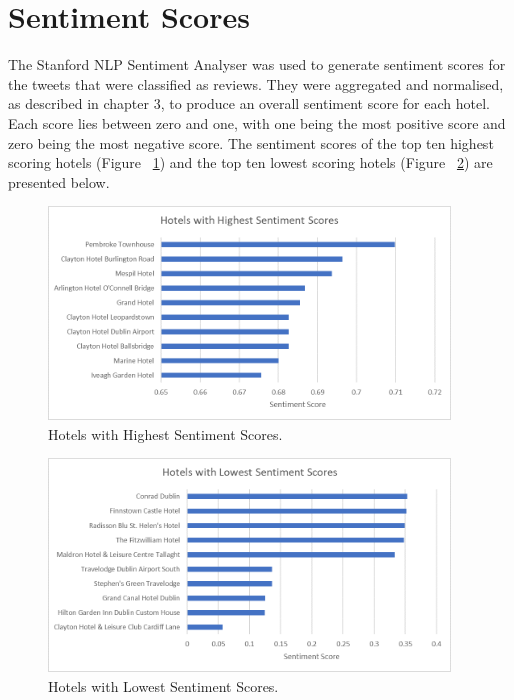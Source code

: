 \section{Sentiment Scores}

The Stanford NLP Sentiment Analyser was used to generate sentiment scores for the tweets that were classified as reviews. They were aggregated and normalised, as described in chapter 3, to produce an overall sentiment score for each hotel. Each score lies between zero and one, with one being the most positive score and zero being the most negative score. The sentiment scores of the top ten highest scoring hotels (Figure ~\ref{fig:highest}) and the top ten lowest scoring hotels (Figure ~\ref{fig:lowest}) are presented below.

\begin{figure}[h!]
\centering
\includegraphics[width=0.95\textwidth]{evaluation/highest.png}
\caption{\label{fig:highest} Hotels with Highest Sentiment Scores.}
\end{figure}

\begin{figure}[h!]
\centering
\includegraphics[width=0.95\textwidth]{evaluation/lowest.png}
\caption{\label{fig:lowest} Hotels with Lowest Sentiment Scores.}
\end{figure}

